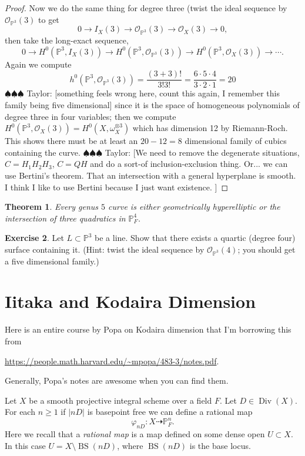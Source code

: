 \documentclass[12pt]{article}
\numberwithin{equation}{section}
\newtheorem{theorem}{Theorem}[subsection]
\theoremstyle{definition}
\newtheorem{exercise}[theorem]{Exercise}
\theoremstyle{remark}
\newcommand{\Ocal}{\mathcal{O}}
\newcommand{\PP}{\mathbb{P}}
\newcommand{\Div}{\operatorname{Div}}
\newcommand{\BS}{\operatorname{BS}}
\newcommand{\taylor}[1]{{\color{blue} \sf $\spadesuit\spadesuit\spadesuit$ Taylor: [#1]}}
\begin{document}
\begin{proof}
	 Now we do the same thing for degree three (twist the ideal sequence by $\Ocal_{\PP^3}(3)$ to get 
	  $$ 0 \to I_X(3) \to \Ocal_{\PP^3}(3) \to \Ocal_X(3) \to 0,$$
	then take the long-exact sequence,
	 $$0\to H^0(\PP^3,I_X(3) ) \to H^0(\PP^3,\Ocal_{\PP^3}(3)) \to H^0(\PP^3,\Ocal_X(3)) \to \cdots.$$
	Again we compute 
	$$h^0(\PP^3,\Ocal_{\PP^3}(3))= \frac{(3+3)!}{3!3!}=\frac{6\cdot 5 \cdot 4}{3\cdot 2 \cdot 1}=20$$ 
	\taylor{something feels wrong here, count this again, I remember this family being five dimensional} since it is the space of homogeneous polynomials of degree three in four variables; then we compute $H^0(\PP^3,\Ocal_X(3) )=H^0(X,\omega_X^{\otimes 3})$ which has dimension 12 by Riemann-Roch.
	This shows there must be at least an $20-12=8$ dimensional family of cubics containing the curve. 
	\taylor{We need to remove the degenerate situations, $C=H_1H_2H_3$, $C=QH$ and do a sort-of inclusion-exclusion thing.
	Or... we can use Bertini's theorem. 
	That an intersection with a general hyperplane is smooth. 
	I think I like to use Bertini because I just want existence.
		}
\end{proof}

\begin{theorem}
	Every genus $5$ curve is either geometrically hyperelliptic or the intersection of three quadratics in $\PP^4_F$. 
\end{theorem}

\begin{exercise}
	Let $L \subset \PP^3$ be a line. 
	Show that there exists a quartic (degree four) surface containing it. 
	(Hint: twist the ideal sequence by $\Ocal_{\PP^3}(4)$; you should get a five dimensional family.)
\end{exercise}

\section{Iitaka and Kodaira Dimension}
Here is an entire course by Popa on Kodaira dimension that I'm borrowing this from
\begin{center}
	\url{https://people.math.harvard.edu/~mpopa/483-3/notes.pdf}.
\end{center}
Generally, Popa's notes are awesome when you can find them.


Let $X$ be a smooth projective integral scheme over a field $F$.
Let $D \in \Div(X)$. 
For each $n\geq 1$ if $\vert nD \vert$ is basepoint free we can define a rational map 
 $$ \varphi_{nD} : X \dashrightarrow \PP^n_F. $$
Here we recall that a \emph{rational map} is a map defined on some dense open $U\subset X$. 
 In this case $U = X\setminus \BS(nD)$, where $\BS(nD)$ is the base locus. 
\end{document}
